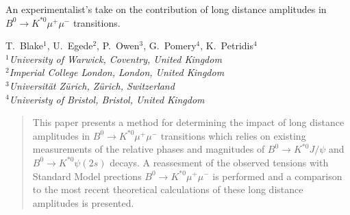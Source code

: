 \begin{titlepage}

{\bf\boldmath\huge
\begin{center}
  An experimentalist's take on the contribution of long distance
  amplitudes in $B^0\to K^{*0}\mu^+\mu^-$ transitions. 
\end{center}
}

\vspace*{2.0cm}

\begin{center}
T.~Blake$^1$, U.~Egede$^2$, P.~Owen$^3$, G.~Pomery$^4$,  K.~Petridis$^{4}$ \bigskip\\
{\it\footnotesize 
$ ^1$University of Warwick, Coventry, United Kingdom \\ \vspace{0.2cm}
$ ^2$Imperial College London, London, United Kingdom \\ \vspace{0.2cm}
$ ^3$Universit\"at Z\"urich, Z\"urich, Switzerland  \\ \vspace{0.2cm}
$ ^4$Univeristy of Bristol, Bristol, United Kingdom \\ \vspace{0.2cm}
}
\end{center}

\vspace{\fill}

\begin{abstract}
  \noindent
  This paper presents a method for determining the impact of long
  distance amplitudes in $B^0\to K^{*0}\mu^+\mu^-$ transitions which
  relies on existing measurements of the relative phases and
  magnitudes of $B^0\to K^{*0}J/\psi$ and $B^0\to K^{*0}\psi(2s)$
  decays. A reassesment of the observed tensions with Standard Model
  prections $B^0\to K^{*0}\mu^+\mu^-$  is performed and 
  a comparison to the most recent theoretical calculations of
  these long distance amplitudes is presented.
  \end{abstract}

\vspace*{2.0cm}
\vspace{\fill}

\end{titlepage}


\pagestyle{empty}  %


\newpage
\setcounter{page}{2}
\mbox{~}

\cleardoublepage
